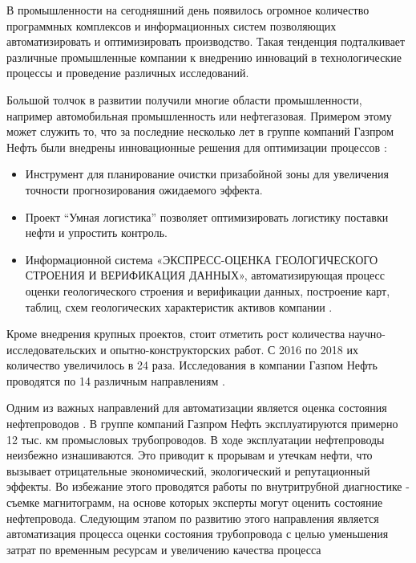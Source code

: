 \documentclass[a4paper,article,14pt]{extarticle}
\begin{document}


\tableofcontents
\pagebreak


В промышленности на сегодняшний день появилось огромное количество программных комплексов и 
информационных систем позволяющих автоматизировать и оптимизировать производство. 
Такая тенденция подталкивает различные промышленные компании к внедрению инноваций 
в технологические процессы и проведение различных исследований. 

Большой толчок в развитии получили многие области промышленности, например автомобильная промышленность или нефтегазовая. 
Примером этому может служить то, что за последние несколько лет в группе компаний Газпром Нефть были 
внедрены инновационные решения для оптимизации процессов \cite{j1}:
\begin{itemize}
    \item Инструмент для планирование очистки призабойной зоны для увеличения точности прогнозирования ожидаемого эффекта.
    \item Проект “Умная логистика” позволяет оптимизировать логистику поставки нефти и упростить контроль.
    \item Информационной система «ЭКСПРЕСС-ОЦЕНКА ГЕОЛОГИЧЕСКОГО СТРОЕНИЯ И ВЕРИФИКАЦИЯ ДАННЫХ», 
    автоматизирующая процесс оценки геологического строения и верификации данных, построение карт, 
    таблиц, схем геологических характеристик активов компании \cite{s1}. 	
\end{itemize}

Кроме внедрения крупных проектов, стоит отметить рост количества научно-исследовательских и опытно-конструкторских работ. 
С 2016 по 2018 их количество увеличилось в 24 раза. Исследования в компании 
Газпом Нефть проводятся по 14 различным направлениям \cite{j2}.

Одним из важных направлений для автоматизации является оценка состояния нефтепроводов \cite{a1}.
В группе компаний Газпром Нефть эксплуатируются примерно 12 тыс. км промысловых трубопроводов. В ходе эксплуатации нефтепроводы неизбежно изнашиваются. 
Это приводит к прорывам и утечкам нефти, что вызывает отрицательные экономический, экологический и репутационный эффекты. 
Во избежание этого проводятся работы по внутритрубной диагностике - съемке магнитограмм, на основе которых эксперты могут оценить состояние нефтепровода. 
Следующим этапом по развитию этого направления является автоматизация процесса оценки состояния трубопровода 
с целью уменьшения затрат по временным ресурсам и увеличению качества процесса
\end{document}
